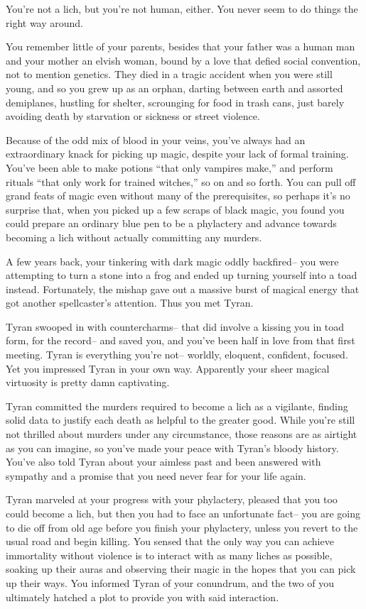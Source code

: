 \documentclass[char]{Sel}
\begin{document}
\name{\cCarminis{}}
You're not a lich, but you're not human, either. You never seem to do things the right way around.

You remember little of your parents, besides that your father was a human man and your mother an elvish woman, bound by a love that defied social convention, not to mention genetics. They died in a tragic accident when you were still young, and so you grew up as an orphan, darting between earth and assorted demiplanes, hustling for shelter, scrounging for food in trash cans, just barely avoiding death by starvation or sickness or street violence.

Because of the odd mix of blood in your veins, you've always had an extraordinary knack for picking up magic, despite your lack of formal training. You've been able to make potions ``that only vampires make,'' and perform rituals ``that only work for trained witches,'' so on and so forth. You can pull off grand feats of magic even without many of the prerequisites, so perhaps it's no surprise that, when you picked up a few scraps of black magic, you found you could prepare an ordinary blue pen to be a phylactery and advance towards becoming a lich without actually committing any murders.

A few years back, your tinkering with dark magic oddly backfired-- you were attempting to turn a stone into a frog and ended up turning yourself into a toad instead. Fortunately, the mishap gave out a massive burst of magical energy that got another spellcaster's attention. Thus you met Tyran.

Tyran swooped in with countercharms-- that did involve a kissing you in toad form, for the record-- and saved you, and you've been half in love from that first meeting. Tyran is everything you're not-- worldly, eloquent, confident, focused. Yet you impressed Tyran in your own way. Apparently your sheer magical virtuosity is pretty damn captivating.

Tyran committed the murders required to become a lich as a vigilante, finding solid data to justify each death as helpful to the greater good. While you're still not thrilled about murders under any circumstance, those reasons are as airtight as you can imagine, so you've made your peace with Tyran's bloody history. You've also told Tyran about your aimless past and been answered with sympathy and a promise that you need never fear for your life again.

Tyran marveled at your progress with your phylactery, pleased that you too could become a lich, but then you had to face an unfortunate fact-- you are going to die off from old age before you finish your phylactery, unless you revert to the usual road and begin killing. You sensed that the only way you can achieve immortality without violence is to interact with as many liches as possible, soaking up their auras and observing their magic in the hopes that you can pick up their ways. You informed Tyran of your conundrum, and the two of you ultimately hatched a plot to provide you with said interaction.
\end{document}
